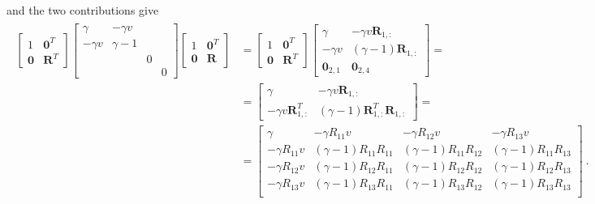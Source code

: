 \documentclass[letterpaper,10pt,english]{jupyterBook}
\begin{document}
\sphinxAtStartPar
and the two contributions give
\begin{equation*}
\begin{split}\begin{aligned}
 \begin{bmatrix} 1 & \mathbf{0}^T \\ \mathbf{0} & \mathbf{R}^T \end{bmatrix}  \begin{bmatrix} \gamma & - \gamma v & & \\ - \gamma v & \gamma - 1 & & \\ & & 0 &  \\ & & &  0 \end{bmatrix} \begin{bmatrix} 1 & \mathbf{0}^T \\ \mathbf{0} & \mathbf{R} \end{bmatrix}
 & = \begin{bmatrix} 1 & \mathbf{0}^T \\ \mathbf{0} & \mathbf{R}^T \end{bmatrix} \begin{bmatrix} \gamma & - \gamma v \mathbf{R}_{1,:} \\ - \gamma v & (\gamma-1)\mathbf{R}_{1,:} \\ \mathbf{0}_{2,1} & \mathbf{0}_{2,4} \end{bmatrix} = \\
 & = \begin{bmatrix} \gamma & - \gamma v \mathbf{R}_{1,:} \\ - \gamma v \mathbf{R}_{1,:}^T & (\gamma-1)  \mathbf{R}_{1,:}^T \mathbf{R}_{1,:} \end{bmatrix} = \\
 & = \begin{bmatrix} \gamma & - \gamma R_{11} v & - \gamma R_{12} v & - \gamma R_{13} v \\
   - \gamma R_{11} v & (\gamma-1) R_{11} R_{11} &  (\gamma-1) R_{11} R_{12} &  (\gamma-1) R_{11} R_{13} \\
   - \gamma R_{12} v & (\gamma-1) R_{12} R_{11} &  (\gamma-1) R_{12} R_{12} &  (\gamma-1) R_{12} R_{13} \\
   - \gamma R_{13} v & (\gamma-1) R_{13} R_{11} &  (\gamma-1) R_{13} R_{12} &  (\gamma-1) R_{13} R_{13} \\
\end{bmatrix} \ .
\end{aligned}\end{split}
\end{equation*}\begin{equation*}

\end{equation*}
\end{document}
